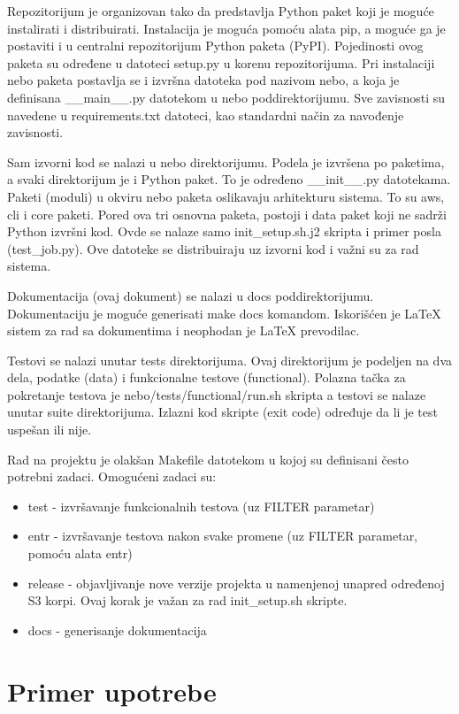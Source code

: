 \documentclass[a4paper]{article}
\begin{document}
Repozitorijum je organizovan tako da predstavlja Python paket koji je moguće
instalirati i distribuirati. Instalacija je moguća pomoću alata pip, a moguće ga
je postaviti i u centralni repozitorijum Python paketa (PyPI). Pojedinosti ovog
paketa su određene u datoteci setup.py u korenu repozitorijuma. Pri instalaciji
nebo paketa postavlja se i izvršna datoteka pod nazivom nebo, a koja je
definisana \_\_main\_\_.py datotekom u nebo poddirektorijumu. Sve zavisnosti su
navedene u requirements.txt datoteci, kao standardni način za navođenje zavisnosti.

Sam izvorni kod se nalazi u nebo direktorijumu. Podela je izvršena po paketima,
a svaki direktorijum je i Python paket. To je određeno \_\_init\_\_.py datotekama.
Paketi (moduli) u okviru nebo paketa oslikavaju arhitekturu sistema. To su aws,
cli i core paketi. Pored ova tri osnovna paketa, postoji i data paket koji ne
sadrži Python izvršni kod. Ovde se nalaze samo init\_setup.sh.j2 skripta i primer
posla (test\_job.py). Ove datoteke se distribuiraju uz izvorni kod i važni su za
rad sistema. 

Dokumentacija (ovaj dokument) se nalazi u docs poddirektorijumu. Dokumentaciju
je moguće generisati make docs komandom. Iskorišćen je LaTeX sistem za rad sa
dokumentima i neophodan je LaTeX prevodilac.

Testovi se nalazi unutar tests direktorijuma. Ovaj direktorijum je podeljen na
dva dela, podatke (data) i funkcionalne testove (functional). Polazna tačka za
pokretanje testova je nebo/tests/functional/run.sh skripta a testovi se nalaze
unutar suite direktorijuma. Izlazni kod skripte (exit code) određuje da li je
test uspešan ili nije.

Rad na projektu je olakšan Makefile datotekom u kojoj su definisani često
potrebni zadaci. Omogućeni zadaci su:

\begin{itemize}
  \item test - izvršavanje funkcionalnih testova (uz FILTER parametar)
  \item entr - izvršavanje testova nakon svake promene (uz FILTER parametar,
    pomoću alata entr)
  \item release - objavljivanje nove verzije projekta u namenjenoj unapred
    određenoj S3 korpi. Ovaj korak je važan za rad init\_setup.sh skripte.
  \item docs - generisanje dokumentacija
\end{itemize}

\newpage
\section{Primer upotrebe}
\end{document}
